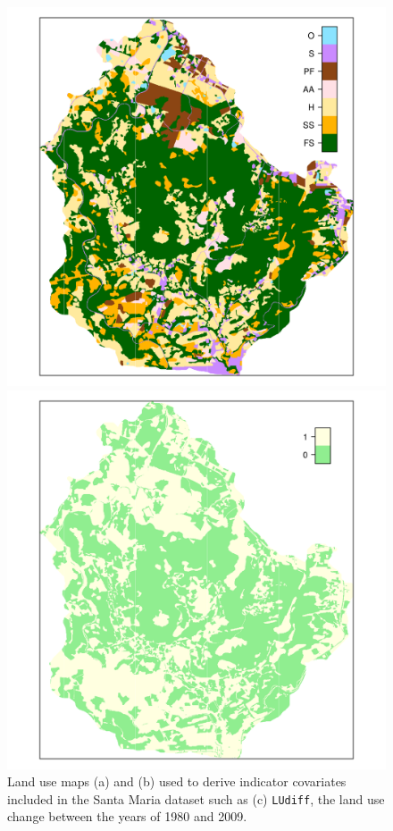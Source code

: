 \begin{figure}[!ht]
\begin{minipage}[b]{0.45\textwidth}
\includegraphics[width = \textwidth]{fig/chap05-land-new}
\end{minipage}
\begin{minipage}[b]{0.45\textwidth}
\subcaption{}
\centering
\includegraphics[width = \textwidth]{fig/chap05-land-diff}
\end{minipage}
\caption[Land use maps included in the Santa Maria dataset.]{Land use maps (a) \landOld{} and (b) \landNew{} 
used to derive indicator covariates included in the Santa Maria dataset such as (c) \texttt{LUdiff}, the land 
use change between the years of 1980 and 2009.}
\label{fig:chap05-land-use}
\end{figure}

